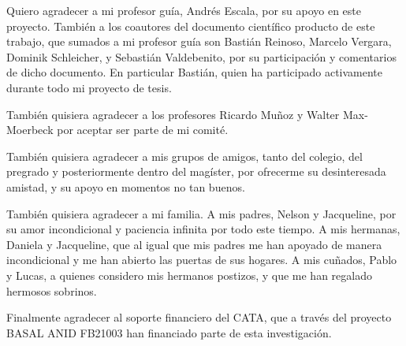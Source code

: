 \documentclass[
	english, %
	letterpaper, oneside
]{book}
\begin{document}
\begin{acknowledgments}
	Quiero agradecer a mi profesor guía, Andrés Escala, por su apoyo en este proyecto. También a los coautores del documento científico producto de este trabajo, que sumados a mi profesor guía son Bastián Reinoso, Marcelo Vergara, Dominik Schleicher, y Sebastián Valdebenito, por su participación y comentarios de dicho documento. En particular Bastián, quien ha participado activamente durante todo mi proyecto de tesis.
	
	También quisiera agradecer a los profesores Ricardo Muñoz y Walter Max-Moerbeck por aceptar ser parte de mi comité.
	
	También quisiera agradecer a mis grupos de amigos, tanto del colegio, del pregrado y posteriormente dentro del magíster, por ofrecerme su desinteresada amistad, y su apoyo en momentos no tan buenos.
	
	También quisiera agradecer a mi familia. A mis padres, Nelson y Jacqueline, por su amor incondicional y paciencia infinita por todo este tiempo. A mis hermanas, Daniela y Jacqueline, que al igual que mis padres me han apoyado de manera incondicional y me han abierto las puertas de sus hogares. A mis cuñados, Pablo y Lucas, a quienes considero mis hermanos postizos, y que me han regalado hermosos sobrinos.
	
	Finalmente agradecer al soporte financiero del CATA, que a través del proyecto BASAL ANID FB21003 han financiado parte de esta investigación.
\end{acknowledgments}

\templateIndex
\end{document}
